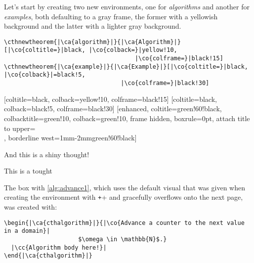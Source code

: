 \documentclass{article}
\begin{document}
Let's start by creating two new environments, one for \emph{algorithms} and another for \emph{examples}, both defaulting to a gray frame, the former with a yellowish background and the latter with a lighter gray background.

\begin{verbatim}
\cthnewtheorem{|\ca{algorithm}|}{|\ca{Algorithm}|}[|\co{coltitle=}|black, |\co{colback=}|yellow!10,
                                     |\co{colframe=}|black!15]
\cthnewtheorem{|\ca{example}|}{|\ca{Example}|}[|\co{coltitle=}|black, |\co{colback}|=black!5,
                                 |\co{colframe=}|black!30]  
\end{verbatim}

[coltitle=black, colback=yellow!10, colframe=black!15]
[coltitle=black, colback=black!5, colframe=black!30]
[enhanced, coltitle=green!60!black, colbacktitle=green!10, 
                                colback=green!10, frame hidden, boxrule=0pt, 
                                attach title to upper={\\[0.5ex]}, 
                                borderline west={1mm}{-2mm}{green!60!black}]

And this is a shiny thought!
\begin{cththought}{This is a tought}
\kant[2]
\end{cththought}

The box with \autoref{alg:advance1}, which uses the default visual that was given when creating the environment with \texttt+\cthnewtheorem+ and gracefully overflows onto the next page, was created with:
\begin{verbatim}
\begin{|\ca{cthalgorithm}|}{|\co{Advance a counter to the next value in a domain}|
                     $\omega \in \mathbb{N}$.}
  |\cc{Algorithm body here!}|
\end{|\ca{cthalgorithm}|}
\end{verbatim}

\newcommand{\bracesemptyset}{\ensuremath{\lbrace\,\rbrace}}
\end{document}
